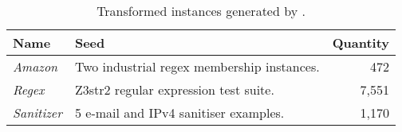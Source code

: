 \begin{table}[t]
    \centering
    \caption{Transformed instances generated by \transformer{}.}
    \label{tbl:transformed}
    \begin{tabular}{|l|l|r|}
        \hline
        \textbf{Name}      & \textbf{Seed}                              & \textbf{Quantity} \\ \hline
        \textit{Amazon}    & Two industrial regex membership instances. & 472 \\ \hline
        \textit{Regex}     & Z3str2 regular expression test suite.      & 7,551 \\ \hline
        \textit{Sanitizer} & 5 e-mail and IPv4 sanitiser examples.      & 1,170 \\ \hline
    \end{tabular}
\end{table}
